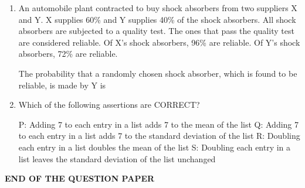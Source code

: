 \documentclass[journal,12pt,onecolumn]{IEEEtran}
\begin{document}
\begin{enumerate}[resume]
    \item An automobile plant contracted to buy shock absorbers from two suppliers X and Y. X supplies 60\% and Y supplies 40\% of the shock absorbers. All shock absorbers are subjected to a quality test. The ones that pass the quality test are considered reliable. Of X's shock absorbers, 96\% are reliable. Of Y's shock absorbers, 72\% are reliable.

          The probability that a randomly chosen shock absorber, which is found to be reliable, is made by Y is

          \begin{enumerate}
          \end{enumerate}

    \item Which of the following assertions are CORRECT?

          P: Adding 7 to each entry in a list adds 7 to the mean of the list
          Q: Adding 7 to each entry in a list adds 7 to the standard deviation of the list
          R: Doubling each entry in a list doubles the mean of the list
          S: Doubling each entry in a list leaves the standard deviation of the list unchanged

          \begin{enumerate}
          \end{enumerate}

\end{enumerate}

\vspace{1cm}
\centering\Large\textbf{END OF THE QUESTION PAPER}
\end{document}
